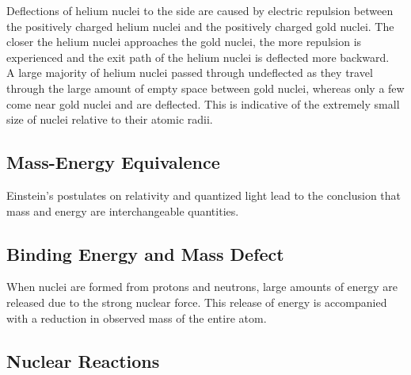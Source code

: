 \documentclass[../main]{subfiles}
\begin{document}
	Deflections of helium nuclei to the side are caused by electric repulsion between the positively charged helium nuclei and the positively charged gold nuclei. The closer the helium nuclei approaches the gold nuclei, the more repulsion is experienced and the exit path of the helium nuclei is deflected more backward. \\

	A large majority of helium nuclei passed through undeflected as they travel through the large amount of empty space between gold nuclei, whereas only a few come near gold nuclei and are deflected. This is indicative of the extremely small size of nuclei relative to their atomic radii. \\

	\subsection{Mass-Energy Equivalence}

	Einstein's postulates on relativity and quantized light lead to the conclusion that mass and energy are interchangeable quantities. \\


	\subsection{Binding Energy and Mass Defect}

	When nuclei are formed from protons and neutrons, large amounts of energy are released due to the strong nuclear force. This release of energy is accompanied with a reduction in observed mass of the entire atom. 




	\subsection{Nuclear Reactions}
\end{document}
